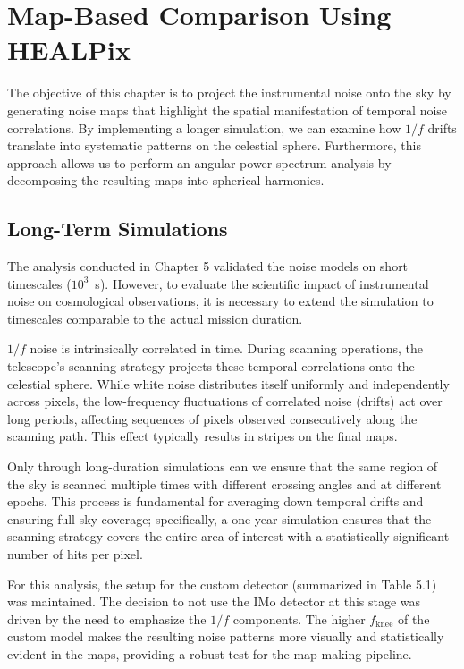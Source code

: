 \chapter{Map-Based Comparison Using HEALPix}

The objective of this chapter is to project the instrumental noise onto the sky by generating noise maps that highlight the spatial manifestation of temporal noise correlations. By implementing a longer simulation, we can examine how $1/f$ drifts translate into systematic patterns on the celestial sphere. Furthermore, this approach allows us to perform an angular power spectrum analysis by decomposing the resulting maps into spherical harmonics.

\section{Long-Term Simulations}

The analysis conducted in Chapter 5 validated the noise models on short timescales ($10^3$~s). However, to evaluate the scientific impact of instrumental noise on cosmological observations, it is necessary to extend the simulation to timescales comparable to the actual mission duration.

$1/f$ noise is intrinsically correlated in time. During scanning operations, the telescope's scanning strategy projects these temporal correlations onto the celestial sphere. While white noise distributes itself uniformly and independently across pixels, the low-frequency fluctuations of correlated noise (drifts) act over long periods, affecting sequences of pixels observed consecutively along the scanning path. This effect typically results in stripes on the final maps.

Only through long-duration simulations can we ensure that the same region of the sky is scanned multiple times with different crossing angles and at different epochs. This process is fundamental for averaging down temporal drifts and ensuring full sky coverage; specifically, a one-year simulation ensures that the scanning strategy covers the entire area of interest with a statistically significant number of hits per pixel.

For this analysis, the setup for the custom detector (summarized in Table 5.1) was maintained. The decision to not use the IMo detector at this stage was driven by the need to emphasize the $1/f$ components. The higher $f_{\text{knee}}$ of the custom model makes the resulting noise patterns more visually and statistically evident in the maps, providing a robust test for the map-making pipeline.

